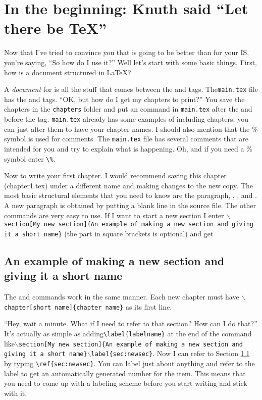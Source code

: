 \chapter{In the beginning: Knuth said ``Let there be \TeX''}\label{text}
Now that I've tried to convince you that \lt is going to be better than \msw for your IS, you're saying, ``So how do I use it?'' Well let's start with some basic things. First, how is a document structured in \LaTeX?

A \emph{document} for \lt is all the stuff that comes between the \verb|| and \verb|| tags. The\verb|main.tex| file has the \verb|| and \verb|| tags. ``OK, but how do I get my chapters to print?'' You save the chapters in the \verb|chapters| folder and put an \verb|| command in \verb|main.tex| after the \verb|| and before the
\verb|| tag. \verb|main.tex| already has some examples of including chapters; you can just alter them to have your chapter names. I should also mention that the \% symbol is used for comments. The \verb|main.tex| file has several comments that are intended for you and try to explain what is happening. Oh, and if you need a \% symbol enter \verb+\%+.

Now to write your first chapter. I would recommend saving this chapter (chapter1.tex) under a different name and making changes to the new copy. The most basic structural elements that you need to know are the paragraph, , , and . A new paragraph is obtained by putting a blank line in the source file.  The other commands are very easy to use. If I want to start a new section I enter \texttt{$\backslash$section[My new section]\{An example of making a new section and giving it a short name\}} (the part in square brackets is optional) and get

\section[My new section]{An example of making a new section and giving it a short name}\label{sec:newsec}

The  and  commands work in the same manner. Each new chapter must have \texttt{$\backslash$chapter[short name]\{chapter name\}} as its first line.

``Hey, wait a minute. What if I need to refer to that section? How can I do that?'' It's actually as simple as adding\verb+\label{labelname}+ at the end of the  command like\texttt{$\backslash$section[My new section]\{An example of making a new section and giving it a short name\}$\backslash$label\{sec:newsec\}}. Now I can refer to Section \ref{sec:newsec} by typing \verb+\ref{sec:newsec}+. You can label just about anything and refer to the label to get an automatically generated number for the item. This means that you need to come up with a labeling scheme before you start writing and stick with it.

